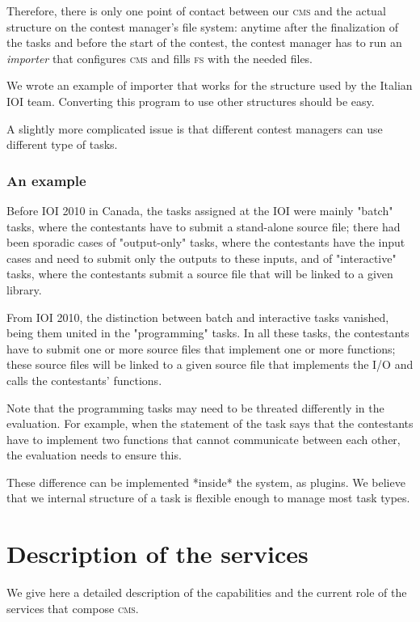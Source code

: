\documentclass[a4paper,8pt]{amsart}
\newcommand{\CMS}{\textsc{cms}}
\newcommand{\FS}{\textsc{fs}}
\begin{document}
\begin{multicols}{2}
  Therefore, there is only one point of contact between our \CMS{} and
  the actual structure on the contest manager's file system: anytime
  after the finalization of the tasks and before the start of the
  contest, the contest manager has to run an \emph{importer\/} that
  configures \CMS{} and fills \FS{} with the needed files.

  We wrote an example of importer that works for the structure used by
  the Italian IOI team. Converting this program to use other
  structures should be easy.

  A slightly more complicated issue is that different contest managers
  can use different type of tasks.

  \subsubsection{An example}

  Before IOI 2010 in Canada, the tasks assigned at the IOI were mainly
  "batch" tasks, where the contestants have to submit a stand-alone
  source file; there had been sporadic cases of "output-only" tasks,
  where the contestants have the input cases and need to submit only
  the outputs to these inputs, and of "interactive" tasks, where the
  contestants submit a source file that will be linked to a given
  library.

  From IOI 2010, the distinction between batch and interactive tasks
  vanished, being them united in the "programming" tasks. In all these
  tasks, the contestants have to submit one or more source files that
  implement one or more functions; these source files will be linked
  to a given source file that implements the I/O and calls the
  contestants' functions.

  Note that the programming tasks may need to be threated differently
  in the evaluation. For example, when the statement of the task says
  that the contestants have to implement two functions that cannot
  communicate between each other, the evaluation needs to ensure this.

  These difference can be implemented *inside* the system, as
  plugins. We believe that we internal structure of a task is flexible
  enough to manage most task types.

  \section{Description of the services}

  We give here a detailed description of the capabilities and the
  current role of the services that compose \CMS{}.


\end{multicols}
\end{document}
